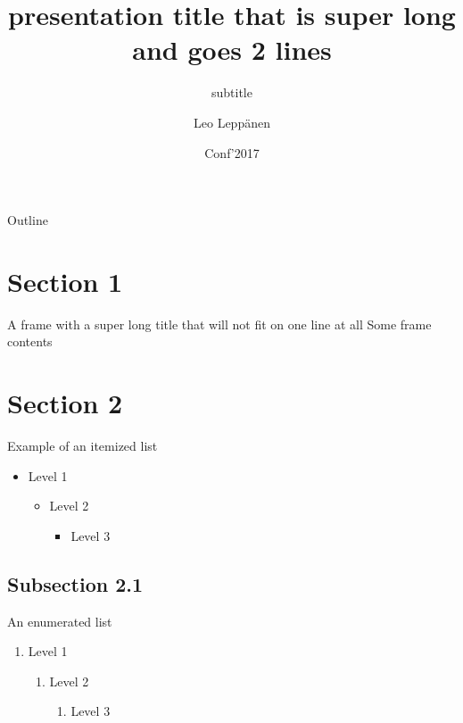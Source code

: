 \documentclass[12pt, t]{beamer}
\title{presentation title that is super long and goes 2 lines}
\subtitle{subtitle}
\author[Leppänen et al.]{Leo Leppänen}
\institute{Department of Computer Science}
\date{Conf'2017}
\begin{document}
\maketitle

\begin{frame}{Outline}
    \begin{center}
        \tableofcontents[hideallsubsections]
    \end{center}
\end{frame}


\section{Section 1}

\begin{frame}{A frame with a super long title that will not fit on one line at all}
    Some frame contents
\end{frame}

\section{Section 2}

\begin{frame}{Example of an itemized list}
    \begin{itemize}
        \item Level 1
        \begin{itemize}
            \item Level 2
            \begin{itemize}
                \item Level 3
            \end{itemize}
        \end{itemize}
    \end{itemize}
\end{frame}

\subsection{Subsection 2.1}

\begin{frame}{An enumerated list}
    \begin{enumerate}
        \item Level 1
        \begin{enumerate}
            \item Level 2
            \begin{enumerate}
                \item Level 3
            \end{enumerate}
        \end{enumerate}
    \end{enumerate}
\end{frame}
\end{document}
